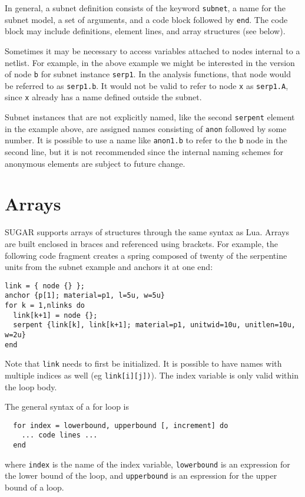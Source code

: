In general, a subnet definition consists of the keyword \texttt{subnet},
a name for the subnet model, a set of arguments, 
and a code block followed by \texttt{end}.  The code block
may include definitions, element lines, and array structures (see below).

Sometimes it may be necessary to access variables attached to nodes
internal to a netlist.  For example, in the above example we might be
interested in the version of node \texttt{b} for subnet instance
\texttt{serp1}.  In the analysis functions, that node would be
referred to as \texttt{serp1.b}.  It would not be valid to refer
to node \texttt{x} as \texttt{serp1.A}, since \texttt{x} already has
a name defined outside the subnet.

Subnet instances that are not explicitly named, like the second 
\texttt{serpent} element in the example above, are assigned names
consisting of \texttt{anon} followed by some number.  It is possible
to use a name like \texttt{anon1.b} to refer to the \texttt{b} node
in the second line, but it is not recommended since the internal
naming schemes for anonymous elements are subject to future change.


\section{Arrays}

SUGAR supports arrays of structures through the same syntax as Lua.
Arrays are built enclosed in braces and referenced using brackets.  
For example, the following code fragment creates a spring composed of 
twenty of the serpentine units from the subnet example and anchors it 
at one end:
\begin{verbatim}
link = { node {} };
anchor {p[1]; material=p1, l=5u, w=5u}
for k = 1,nlinks do
  link[k+1] = node {};
  serpent {link[k], link[k+1]; material=p1, unitwid=10u, unitlen=10u, w=2u}
end
\end{verbatim}
Note that \texttt{link} needs to first be initialized.  It is
possible to have names with multiple indices as well (eg \texttt{link[i][j])}).
The index variable is only valid within the loop body.

The general syntax of a for loop is
\begin{verbatim}
  for index = lowerbound, upperbound [, increment] do
    ... code lines ...
  end
\end{verbatim}
where \texttt{index} is the name of the index variable, 
\texttt{lowerbound} is an expression for the lower bound of the loop, and 
\texttt{upperbound} is an espression for the upper bound of a loop.


